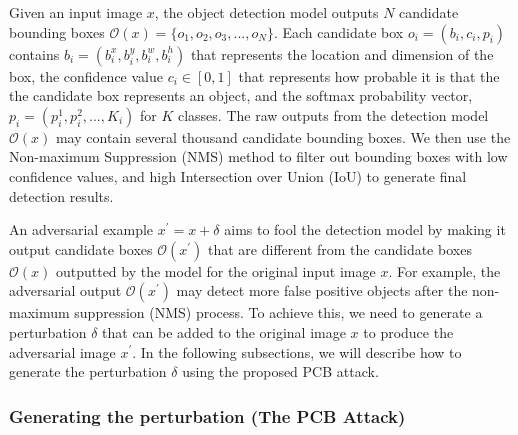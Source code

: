 Given an input image $x$, the object detection model outputs $N$ candidate bounding boxes $\mathcal{O}(x) = \{o_1, o_2, o_3, ..., o_N\}$. Each candidate box $o_i=(b_i, c_i, p_i)$ contains $b_i=(b^x_i, b^y_i, b^w_i, b^h_i)$ that represents the location and dimension of the box, the confidence value $c_i \in [0, 1]$ that represents how probable it is that the the candidate box represents an object, and the softmax probability vector, $p_i=(p^1_i, p^2_i, ..., K_i)$ for $K$ classes. The raw outputs from the detection model $\mathcal{O}(x)$ may contain several thousand candidate bounding boxes. We then use the Non-maximum Suppression (NMS) method \cite{bodla2017soft} to filter out bounding boxes with low confidence values, and high Intersection over Union (IoU) to generate final detection results.


An adversarial example $x^{'} = x + \delta$ aims to fool the detection model by making it output candidate boxes $\mathcal{O}(x^{'})$ that are different from the candidate boxes $\mathcal{O}(x)$ outputted by the model for the original input image $x$. For example, the adversarial output $\mathcal{O}(x^{'})$ may detect more false positive objects after the non-maximum suppression (NMS) process. To achieve this, we need to generate a perturbation $\delta$ that can be added to the original image $x$ to produce the adversarial image $x^{'}$. In the following subsections, we will describe how to generate the perturbation $\delta$ using the proposed PCB attack.

\subsubsection{Generating the perturbation (The PCB Attack)}


